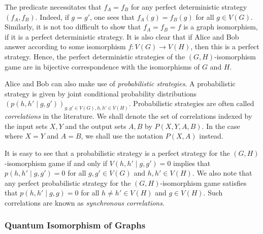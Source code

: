 \documentclass[11pt,a4paper]{article}
\theoremstyle{plain}
\theoremstyle{remark}
\theoremstyle{definition}
\begin{document}
The predicate necessitates that $f_A = f_B$ for any perfect deterministic strategy $(f_A, f_B)$. Indeed, if $g = g'$, one sees that $f_A(g) = f_B(g)$ for all $g \in V(G)$. Similarly, it is not too difficult to show that $f_A = f_B = f$ is a graph isomorphism, if it is a perfect deterministic strategy. It is also clear that if Alice and Bob answer according to some isomorphism $f\colon V(G) \to V(H)$, then this is a perfect strategy. Hence, the perfect deterministic strategies of the $(G,H)$-isomorphism game are in bijective correspondence with the isomorphisms of $G$ and $H$.

Alice and Bob can also make use of \emph{probabilistic strategies}. A probabilistic strategy is given by joint conditional probability distributions $(p(h,h'\mid g,g'))_{g,g'\in V(G), h,h'\in V(H)}$. Probabilistic strategies are often called \emph{correlations} in the literature. We shall denote the set of correlations indexed by the input sets $X, Y$ and the output sets $A, B$ by $P(X, Y, A, B)$. In  the case where $X = Y$ and $A = B$, we shall use the notation $P(X, A)$ instead. 

It is easy to see that a probabilistic strategy is a perfect strategy for the $(G,H)$-isomorphism game if and only if $V(h,h'\mid g,g') = 0$ implies that $p(h,h'\mid g,g') = 0$ for all $g,g'\in V(G)$ and $h,h' \in V(H)$. We also note that any perfect probabilistic strategy for the $(G,H)$-isomorphism game satisfies that $p(h,h'\mid g,g) = 0$ for all $h \neq h' \in V(H)$ and $g \in V(H)$. Such correlations are known as \emph{synchronous correlations}. 


\subsubsection{Quantum Isomorphism of Graphs}
\end{document}
